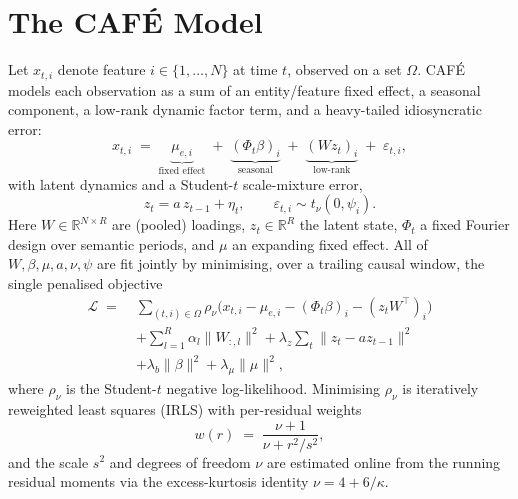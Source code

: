 \documentclass[10pt,twocolumn]{article}
\newcommand{\cafe}{CAF\'E}
\begin{document}
\section{The \cafe{} Model}\label{sec:model}
Let $x_{t,i}$ denote feature $i\in\{1,\dots,N\}$ at time $t$, observed on a set
$\Omega$. \cafe{} models each observation as a sum of an entity/feature fixed
effect, a seasonal component, a low-rank dynamic factor term, and a
heavy-tailed idiosyncratic error:
\begin{equation}
x_{t,i} \;=\; \underbrace{\mu_{e,i}}_{\text{fixed effect}}
\;+\; \underbrace{(\Phi_t\beta)_i}_{\text{seasonal}}
\;+\; \underbrace{(W z_t)_i}_{\text{low-rank}}
\;+\; \varepsilon_{t,i},
\label{eq:decomp}
\end{equation}
with latent dynamics and a Student-$t$ scale-mixture error,
\begin{equation}
z_t = a\,z_{t-1} + \eta_t,\qquad
\varepsilon_{t,i}\sim t_\nu\!\left(0,\psi_i\right).
\label{eq:dyn}
\end{equation}
Here $W\in\mathbb{R}^{N\times R}$ are (pooled) loadings, $z_t\in\mathbb{R}^{R}$
the latent state, $\Phi_t$ a fixed Fourier design over semantic periods, and
$\mu$ an expanding fixed effect. All of $W,\beta,\mu,a,\nu,\psi$ are fit jointly
by minimising, over a trailing causal window, the single penalised objective
\begin{align}
\mathcal{L} \;=\;
&\sum_{(t,i)\in\Omega}\!\rho_\nu\!\big(x_{t,i}-\mu_{e,i}-(\Phi_t\beta)_i-(z_tW^{\!\top})_i\big)
\nonumber\\
&+\sum_{l=1}^{R}\alpha_l\|W_{:,l}\|^2
+\lambda_z\!\sum_t\|z_t-a z_{t-1}\|^2 \nonumber\\
&+\lambda_b\|\beta\|^2 + \lambda_\mu\|\mu\|^2,
\label{eq:obj}
\end{align}
where $\rho_\nu$ is the Student-$t$ negative log-likelihood. Minimising $\rho_\nu$
is iteratively reweighted least squares (IRLS) with per-residual weights
\begin{equation}
w(r) \;=\; \frac{\nu+1}{\nu + r^2/s^2},
\label{eq:irls}
\end{equation}
and the scale $s^2$ and degrees of freedom $\nu$ are estimated online from the
running residual moments via the excess-kurtosis identity $\nu = 4 + 6/\kappa$.
\end{document}
